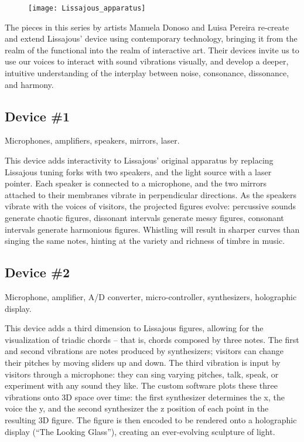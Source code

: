 \begin{figure}[!h]
\centering
\texttt{[image: Lissajous\_apparatus]}
\end{figure}

The pieces in this series by artists Manuela Donoso and Luisa Pereira re-create and extend Lissajous' device using contemporary technology, bringing it from the realm of the functional into the realm of interactive art. Their devices invite us to use our voices to interact with sound vibrations visually, and develop a deeper, intuitive understanding of the interplay between noise, consonance, dissonance, and harmony.



\subsection{Device \#1}
Microphones, amplifiers, speakers, mirrors, laser.

This device adds interactivity to Lissajous' original apparatus by replacing Lissajous tuning forks with two speakers, and the light source with a laser pointer. Each speaker is connected to a microphone, and the two mirrors attached to their membranes vibrate in perpendicular directions. As the speakers vibrate with the voices of visitors, the projected figures evolve: percussive sounds generate chaotic figures, dissonant intervals generate messy figures, consonant intervals generate harmonious figures. Whistling will result in sharper curves than singing the same notes, hinting at the variety and richness of timbre in music.

\subsection{Device \#2}
Microphone, amplifier, A/D converter, micro-controller, synthesizers, holographic display.

This device adds a third dimension to Lissajous figures, allowing for the visualization of triadic chords -- that is, chords composed by three notes. The first and second vibrations are notes produced by synthesizers; visitors can change their pitches by moving sliders up and down. The third vibration is input by visitors through a microphone: they can sing varying pitches, talk, speak, or experiment with any sound they like. The custom software plots these three vibrations onto 3D space over time: the first synthesizer determines the x, the voice the y, and the second synthesizer the z position of each point in the resulting 3D figure. The figure is then encoded to be rendered onto a holographic display (``The Looking Glass''), creating an ever-evolving sculpture of light.

